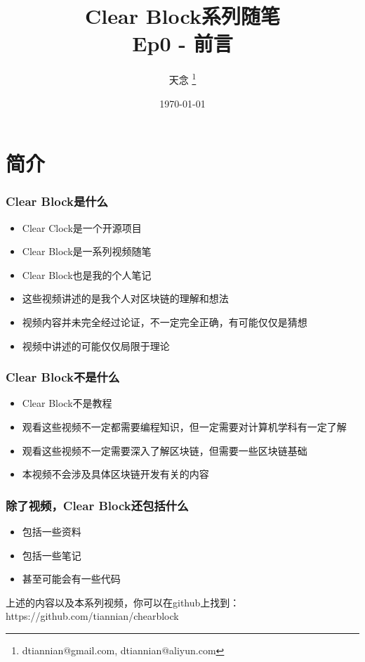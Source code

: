 \documentclass{beamer}
\title{Clear Block系列随笔 \\ Ep0 - 前言}
\author{天念 \thanks{dtiannian@gmail.com, dtiannian@aliyun.com}}
\date{\today}
\begin{document}
\begin{frame}
    \titlepage
\end{frame}

\section{简介}
\begin{frame}
    \frametitle{Clear Block是什么}
    \begin{itemize}
        \item Clear Clock是一个开源项目
        \item Clear Block是一系列视频随笔
        \item Clear Block也是我的个人笔记
        \item 这些视频讲述的是我个人对区块链的理解和想法
        \item 视频内容并未完全经过论证，不一定完全正确，有可能仅仅是猜想
        \item 视频中讲述的可能仅仅局限于理论
    \end{itemize}
\end{frame}

\begin{frame}
    \frametitle{Clear Block不是什么}
    \begin{itemize}
        \item Clear Block不是教程
        \item 观看这些视频不一定都需要编程知识，但一定需要对计算机学科有一定了解
        \item 观看这些视频不一定需要深入了解区块链，但需要一些区块链基础
        \item 本视频不会涉及具体区块链开发有关的内容
    \end{itemize}
\end{frame}

\begin{frame}
    \frametitle{除了视频，Clear Block还包括什么}
    \begin{itemize}
        \item 包括一些资料
        \item 包括一些笔记
        \item 甚至可能会有一些代码
    \end{itemize}
    上述的内容以及本系列视频，你可以在github上找到： \\
    https://github.com/tiannian/chearblock
\end{frame}
\end{document}
